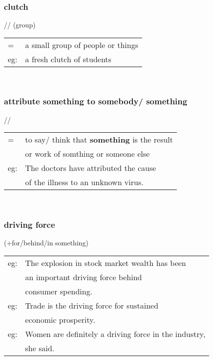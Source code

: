 \documentclass[14pt, t]{beamer}
\begin{document}
\begin{frame}
\frametitle{clutch} 
// \quad (group) \\[8pt]
\begin{tabular}{ll}
= & a small group of people or things \\[8pt]
eg: & a fresh clutch of students
\end{tabular} \\
\end{frame}
\begin{frame}
\frametitle{attribute {\bf something} to somebody/ something} 
// \\[8pt]
\begin{tabular}{ll}
= & to say/ think that {\bf something} is the result \\[1pt]
	& or work of somthing or someone else \\[8pt]
eg: & The doctors have attributed the cause \\[1pt]
	& of the illness to an unknown virus. 
\end{tabular} \\
\end{frame}
\begin{frame}
\frametitle{driving force} 
(+for/behind/in something) \\[8pt]
\begin{tabular}{ll}
eg: & The explosion in stock market wealth has been \\[1pt]
	& an important driving force behind\\[1pt] 
	& consumer spending. \\[8pt]
eg: & Trade is the driving force for sustained \\[1pt]
	& economic prosperity. \\[8pt]
eg: & Women are definitely a driving force in the industry,\\[1pt] 
	& she said. \\[8pt]
\end{tabular}
\end{frame}
\end{document}
